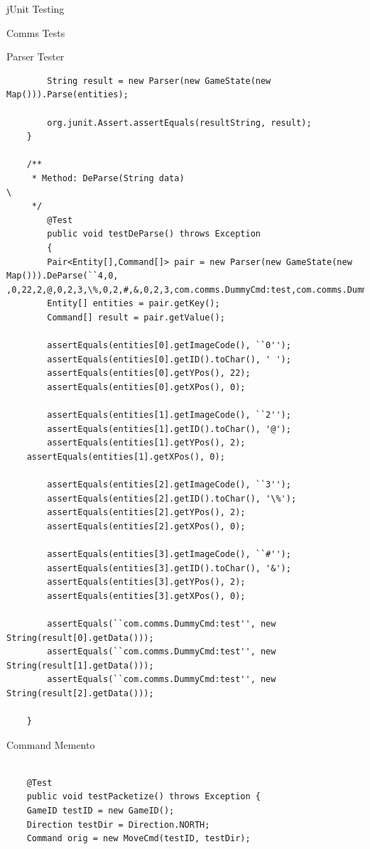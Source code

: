 \documentclass[12pt]{report}
\begin{document}
\begin{chapter}{jUnit Testing}
\begin{section}{Comms Tests}
\begin{subsection}{Parser Tester}
\begin{lstlisting}
        String result = new Parser(new GameState(new Map())).Parse(entities);

        org.junit.Assert.assertEquals(resultString, result);
    }
    
    /**
     * Method: DeParse(String data)                                                      \
     */
        @Test
        public void testDeParse() throws Exception
        { 
        Pair<Entity[],Command[]> pair = new Parser(new GameState(new Map())).DeParse(``4,0, ,0,22,2,@,0,2,3,\%,0,2,#,&,0,2,3,com.comms.DummyCmd:test,com.comms.DummyCmd:test,com.comms.DummyCmd:test,'');
        Entity[] entities = pair.getKey();
        Command[] result = pair.getValue();

        assertEquals(entities[0].getImageCode(), ``0'');
        assertEquals(entities[0].getID().toChar(), ' ');
        assertEquals(entities[0].getYPos(), 22);
        assertEquals(entities[0].getXPos(), 0);

        assertEquals(entities[1].getImageCode(), ``2'');
        assertEquals(entities[1].getID().toChar(), '@');
        assertEquals(entities[1].getYPos(), 2);
	assertEquals(entities[1].getXPos(), 0);

        assertEquals(entities[2].getImageCode(), ``3'');
        assertEquals(entities[2].getID().toChar(), '\%');                                  
        assertEquals(entities[2].getYPos(), 2);
        assertEquals(entities[2].getXPos(), 0);

        assertEquals(entities[3].getImageCode(), ``#'');
        assertEquals(entities[3].getID().toChar(), '&');
        assertEquals(entities[3].getYPos(), 2);
        assertEquals(entities[3].getXPos(), 0);

        assertEquals(``com.comms.DummyCmd:test'', new String(result[0].getData()));
        assertEquals(``com.comms.DummyCmd:test'', new String(result[1].getData()));
        assertEquals(``com.comms.DummyCmd:test'', new String(result[2].getData()));

    }

 \end{lstlisting}
  \end{subsection}

  \begin{subsection}{Command Memento}
   \begin{lstlisting}
    
    @Test
    public void testPacketize() throws Exception {
    GameID testID = new GameID();
    Direction testDir = Direction.NORTH;
    Command orig = new MoveCmd(testID, testDir);


\end{lstlisting}
\end{subsection}
\end{section}
\end{chapter}
\end{document}
